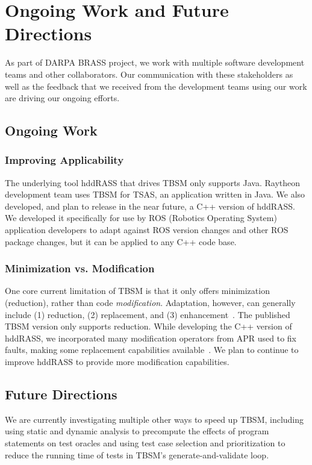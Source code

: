 \section{Ongoing Work and Future Directions}
As part of DARPA BRASS project, we work with multiple software development teams and other collaborators. Our communication with these stakeholders as well as the feedback that we received from the development teams using our work are driving our ongoing efforts.
\subsection{Ongoing Work}
\subsubsection{Improving Applicability}
The underlying tool hddRASS that drives TBSM only supports Java. Raytheon development team uses TBSM for TSAS, an application written in Java.  We also developed, and plan to release in the near future, a C++ version of hddRASS.  We developed it specifically for use by ROS (Robotics Operating System) application developers to adapt against ROS version changes and other ROS package changes, but it can be applied to any C++ code base.

\subsubsection{Minimization vs. Modification}
One core current limitation of TBSM is that it only offers minimization (reduction), rather than code \emph{modification}. Adaptation, however, can generally include (1) reduction, (2) replacement, and (3) enhancement~\cite{hughes2016building}. The published TBSM version only supports reduction. While developing the C++ version of hddRASS, we incorporated many modification operators from APR used to fix faults, making some replacement capabilities available~\cite{Forrest2009genetic,Arcuri2009phdthesis,Debroy2010using}. We plan to continue to improve hddRASS to provide more modification capabilities. 

\subsection{Future Directions}
We are currently investigating multiple other ways to speed up TBSM, including using static and dynamic analysis to precompute the effects of program statements on test oracles and using test case selection and prioritization to reduce the running time of tests in TBSM’s generate-and-validate loop.

